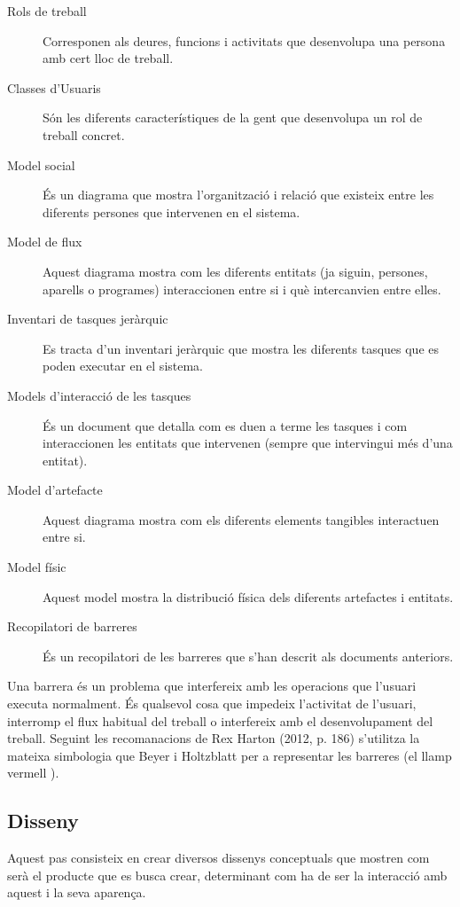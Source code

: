 \begin{description}
\item[Rols de treball] Corresponen als deures, funcions i activitats que desenvolupa una persona amb cert lloc de treball.
\item[Classes d'Usuaris] Són les diferents característiques de la gent que desenvolupa un rol de treball concret.
\item[Model social] És un diagrama que mostra l'organització i relació que existeix entre les diferents persones que intervenen en el sistema.
\item[Model de flux] Aquest diagrama mostra com les diferents entitats (ja siguin, persones, aparells o programes) interaccionen entre si i què intercanvien entre elles.
\item[Inventari de tasques jeràrquic] Es tracta d'un inventari jeràrquic que mostra les diferents tasques que es poden executar en el sistema.
\item[Models d'interacció de les tasques] És un document que detalla com es duen a terme les tasques i com interaccionen les entitats que intervenen (sempre que intervingui més d'una entitat).
\item[Model d'artefacte] Aquest diagrama mostra com els diferents elements tangibles interactuen entre si.
\item[Model físic] Aquest model mostra la distribució física dels diferents artefactes i entitats.
\item[Recopilatori de barreres] És un recopilatori de les barreres que s'han descrit als documents anteriors.
\end{description}

Una barrera és un problema que interfereix amb les operacions que l'usuari executa normalment. És qualsevol cosa que impedeix l'activitat de l'usuari, interromp el flux habitual del treball o interfereix amb el desenvolupament del treball. Seguint les recomanacions de Rex Harton (2012, p. 186) \cite{UX_Book} s'utilitza la mateixa simbologia que Beyer i Holtzblatt \cite{Contextual_Design} per a representar les barreres (el llamp vermell \barrier).

\subsection{Disseny}
Aquest pas consisteix en crear diversos dissenys conceptuals que mostren com serà el producte que es busca crear, determinant com ha de ser la interacció amb aquest i la seva aparença. 

